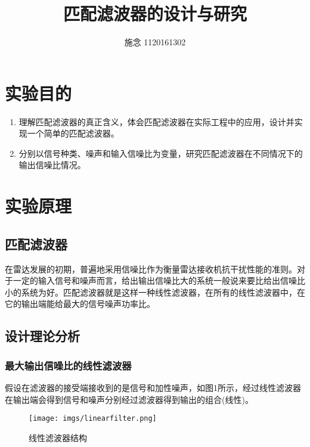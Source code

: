 \documentclass[a4paper]{article}
\begin{document}
\title{匹配滤波器的设计与研究}
\author{ 施念 1120161302}
\maketitle{}
\newpage

\begin{center}
\tableofcontents\label{c}
\end{center}
\newpage
\section{实验目的}
\begin{enumerate}[(1) ]
\item
理解匹配滤波器的真正含义，体会匹配滤波器在实际工程中的应用，设计并实现一个简单的匹配滤波器。
\item
分别以信号种类、噪声和输入信噪比为变量，研究匹配滤波器在不同情况下的输出信噪比情况。
\end{enumerate}

\section{实验原理}
\subsection{匹配滤波器}
在雷达发展的初期，普遍地采用信噪比作为衡量雷达接收机抗干扰性能的准则。对于一定的输入信号和噪声而言，给出输出信噪比大的系统一般说来要比给出信噪比小的系统为好。匹配滤波器就是这样一种线性滤波器，在所有的线性滤波器中，在它的输出端能给最大的信号噪声功率比。
\subsection{设计理论分析}
\subsubsection{最大输出信噪比的线性滤波器}
假设在滤波器的接受端接收到的是信号和加性噪声，如图1所示，经过线性滤波器在输出端会得到信号和噪声分别经过滤波器得到输出的组合(线性)。
\begin{figure}[ht]
\centering
\texttt{[image: imgs/linearfilter.png]}
\caption{线性滤波器结构}
\end{figure}
\end{document}
